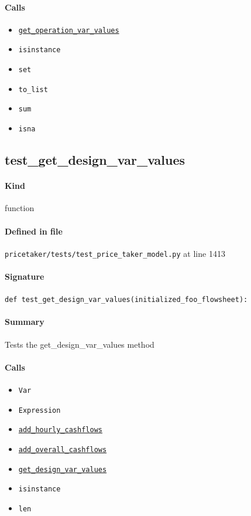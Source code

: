 \documentclass[11pt]{report}
\begin{document}
\paragraph{Calls}
\begin{itemize}[leftmargin=*]
  \item \hyperref[def:pricetaker-price_taker_model.py:PriceTakerModel.get_operation_var_values:L1202]{\texttt{get\_operation\_var\_values}}
  \item \texttt{isinstance}
  \item \texttt{set}
  \item \texttt{to\_list}
  \item \texttt{sum}
  \item \texttt{isna}
\end{itemize}
\subsection{test\_get\_design\_var\_values}
\label{def:pricetaker-tests-test_price_taker_model.py:test_get_design_var_values:L1413}
\paragraph{Kind} function
\paragraph{Defined in file} \texttt{pricetaker/tests/test\_price\_taker\_model.py} at line 1413
\paragraph{Signature} \texttt{def test\_get\_design\_var\_values(initialized\_foo\_flowsheet):}
\paragraph{Summary} Tests the get\_design\_var\_values method
\paragraph{Calls}
\begin{itemize}[leftmargin=*]
  \item \texttt{Var}
  \item \texttt{Expression}
  \item \hyperref[def:pricetaker-price_taker_model.py:PriceTakerModel.add_hourly_cashflows:L897]{\texttt{add\_hourly\_cashflows}}
  \item \hyperref[def:pricetaker-price_taker_model.py:PriceTakerModel.add_overall_cashflows:L997]{\texttt{add\_overall\_cashflows}}
  \item \hyperref[def:pricetaker-price_taker_model.py:PriceTakerModel.get_design_var_values:L1245]{\texttt{get\_design\_var\_values}}
  \item \texttt{isinstance}
  \item \texttt{len}
\end{itemize}
\end{document}
